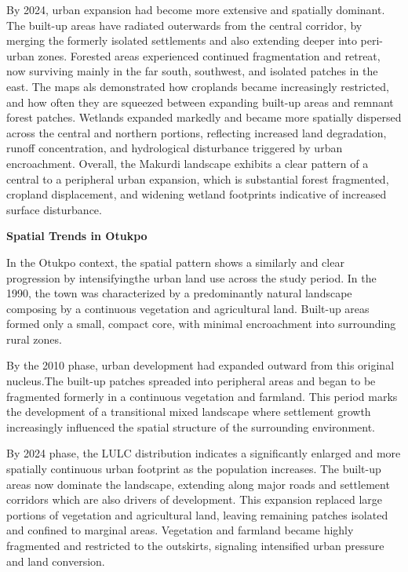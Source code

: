 By 2024, urban expansion had become more extensive and spatially dominant. The built-up areas have radiated outerwards from the central corridor, by merging the formerly isolated settlements and also extending deeper into peri-urban zones. Forested areas experienced continued fragmentation and retreat, now surviving mainly in the far south, southwest, and isolated patches in the east. The maps als demonstrated how croplands became increasingly restricted, and how often they are squeezed between expanding built-up areas and remnant forest patches. Wetlands expanded markedly and became more spatially dispersed across the central and northern portions, reflecting increased land degradation, runoff concentration, and hydrological disturbance triggered by urban encroachment. Overall, the Makurdi landscape exhibits a clear pattern of a central to a peripheral urban expansion, which is substantial forest fragmented, cropland displacement, and widening wetland footprints indicative of increased surface disturbance.

\textbf{Spatial Trends in Otukpo}

In the Otukpo context, the spatial pattern shows a similarly and clear progression by intensifyingthe urban land use across the study period. In the 1990, the town was characterized by a predominantly natural landscape composing by a continuous vegetation and agricultural land. Built-up areas formed only a small, compact core, with minimal encroachment into surrounding rural zones.

By the 2010 phase, urban development had expanded outward from this original nucleus.The built-up patches spreaded into peripheral areas and began to be fragmented formerly in a continuous vegetation and farmland. This period marks the development of a transitional mixed landscape where settlement growth increasingly influenced the spatial structure of the surrounding environment.

By 2024 phase, the LULC distribution indicates a significantly enlarged and more spatially continuous urban footprint as the population increases. The built-up areas now dominate the landscape, extending along major roads and settlement corridors which are also drivers of development. This expansion replaced large portions of vegetation and agricultural land, leaving remaining patches isolated and confined to marginal areas. Vegetation and farmland became highly fragmented and restricted to the outskirts, signaling intensified urban pressure and land conversion.

